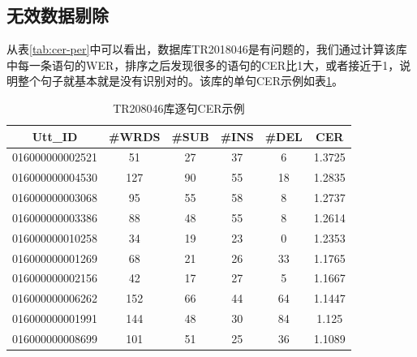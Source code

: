 
\subsection{无效数据剔除}
从表\ref{tab:cer-per}中可以看出，数据库TR2018046是有问题的，我们通过计算该库中每一条语句的WER，排序之后发现很多的语句的CER比1大，或者接近于1，说明整个句子就基本就是没有识别对的。该库的单句CER示例如表\ref{tab:tr2018046}。
\begin{table}[h]
 \centering
 \caption{TR208046库逐句CER示例}
	 \begin{tabular*}{1\textwidth}{@{\extracolsep{\fill}}cccccc}
	 \toprule
		{\bf Utt\_ID  }  & {\bf #WRDS   } & {\bf #SUB    } & {\bf #INS    } & {\bf #DEL    } & {\bf CER} \\
	 \midrule
		016000000002521    & 	51     & 	27    &  	37    &  	6     &  	1.3725 \\
		016000000004530    & 	127    & 	90    &  	55    &  	18    &  	1.2835 \\
		016000000003068    & 	95     & 	55    &  	58    &  	8     &  	1.2737 \\
		016000000003386    & 	88     & 	48    &  	55    &  	8     &  	1.2614 \\
		016000000010258    & 	34     & 	19    &  	23    &  	0     &  	1.2353 \\
		016000000001269    & 	68     & 	21    &  	26    &  	33    &  	1.1765 \\
		016000000002156    & 	42     & 	17    &  	27    &  	5     &  	1.1667 \\
		016000000006262    & 	152    & 	66    &  	44    &  	64    &  	1.1447 \\
		016000000001991    & 	144    & 	48    &  	30    &  	84    &  	1.125  \\
		016000000008699    & 	101    & 	51    &  	25    &  	36    &  	1.1089 \\
	 \bottomrule
	 \end{tabular*}%
 \label{tab:tr2018046}%
\end{table}%

